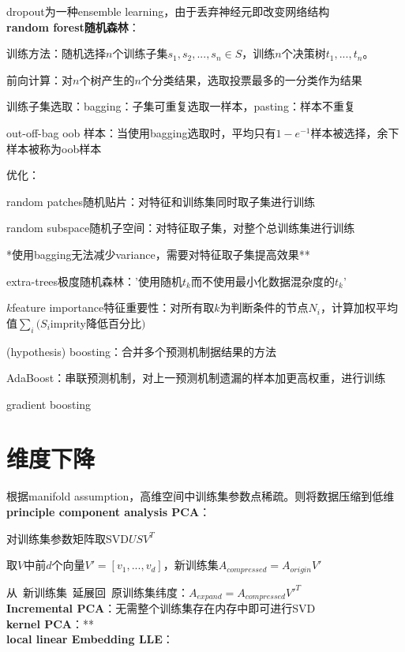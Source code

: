 \documentclass[UTF8]{ctexart}
\begin{document}
  dropout为一种ensemble learning，由于丢弃神经元即改变网络结构\\
\textbf{random forest随机森林}：

  训练方法：随机选择$n$个训练子集$s_1, s_2, ..., s_n \in S$，训练$n$个决策树$t_1, ..., t_n$。
  
  前向计算：对$n$个树产生的$n$个分类结果，选取投票最多的一分类作为结果
  
  训练子集选取：bagging：子集可重复选取一样本，pasting：样本不重复
  
  \quad out-off-bag oob 样本：当使用bagging选取时，平均只有$1-e^{-1}$样本被选择，余下样本被称为oob样本

  优化：

  \quad random patches随机贴片：对特征和训练集同时取子集进行训练
  
  \quad random subspace随机子空间：对特征取子集，对整个总训练集进行训练

  \quad \quad **使用bagging无法减少variance，需要对特征取子集提高效果**
  
  \quad extra-trees极度随机森林：'使用随机$t_k$而不使用最小化数据混杂度的$t_k$'
  
  \quad $k$feature importance特征重要性：对所有取$k$为判断条件的节点$N_i$，计算加权平均值$\sum_i(S_i$imprity降低百分比$)$
  
  \quad (hypothesis) boosting：合并多个预测机制据结果的方法
  
  \quad \quad AdaBoost：串联预测机制，对上一预测机制遗漏的样本加更高权重，进行训练

  \quad \quad gradient boosting


\section{维度下降}
\noindent 根据manifold assumption，高维空间中训练集参数点稀疏。则将数据压缩到低维\\
\textbf{principle component analysis PCA}：

  对训练集参数矩阵取SVD$USV^T$

  取$V$中前$d$个向量$V' = [v_1, ..., v_d]$，新训练集$A_{compressed} = A_{origin}V'$
  
  从\ 新训练集\ 延展回\ 原训练集纬度：$A_{expand} = A_{compressed}V'^T$\\
\textbf{Incremental PCA}：无需整个训练集存在内存中即可进行SVD\\
\textbf{kernel PCA}：**\\
\textbf{local linear Embedding LLE}：
  
\end{document}
